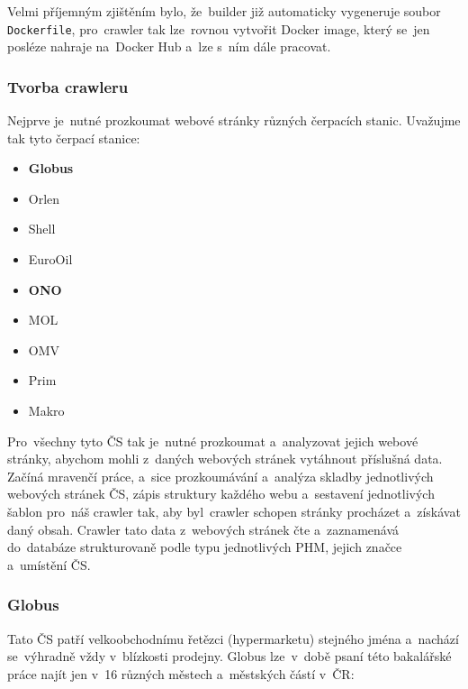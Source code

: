 Velmi příjemným zjištěním bylo, že~builder již automaticky vygeneruje
soubor \texttt{Dockerfile}, pro~crawler tak lze~rovnou vytvořit
Docker image, který se~jen posléze nahraje na~Docker Hub a~lze s~ním
dále pracovat.

\subsubsection{Tvorba crawleru}
\label{sec:crawler-preps}

Nejprve je~nutné prozkoumat webové stránky různých čerpacích stanic.
Uvažujme tak tyto čerpací stanice:

\begin{itemize}
    \item \textbf{Globus}
    \item Orlen
    \item Shell
    \item EuroOil
    \item \textbf{ONO}
    \item MOL
    \item OMV
    \item Prim
    \item Makro
\end{itemize}

Pro~všechny tyto ČS tak je~nutné prozkoumat a~analyzovat jejich webové
stránky, abychom mohli z~daných webových stránek vytáhnout příslušná data.
Začíná mravenčí práce, a~sice prozkoumávání a~analýza skladby jednotlivých
webových stránek ČS, zápis struktury každého webu a~sestavení jednotlivých
šablon pro~náš crawler tak, aby byl~crawler schopen stránky procházet
a~získávat daný obsah. Crawler tato data z~webových stránek čte a~zaznamenává
do~databáze strukturovaně podle typu jednotlivých PHM, jejich značce
a~umístění ČS.

\subsubsection{Globus}
\label{sec:preps-globus}

Tato ČS patří velkoobchodnímu řetězci (hypermarketu) stejného jména
a~nachází se~výhradně vždy v~blízkosti prodejny. Globus lze~v~době
psaní této bakalářské práce najít jen v~16 různých městech a~městských
částí v~ČR:

